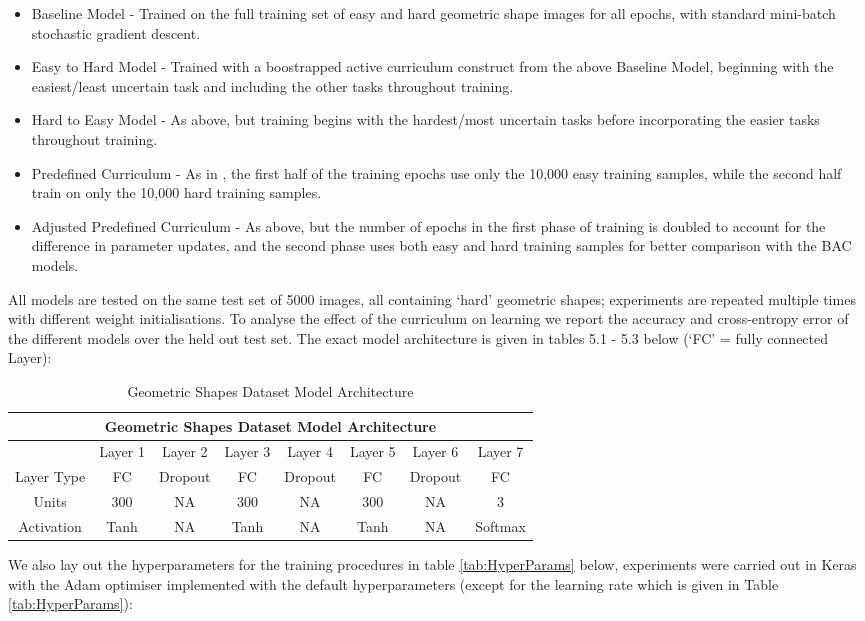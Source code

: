  \begin{itemize}
 \item Baseline Model - Trained on the full training set of easy and hard geometric shape images for all epochs, with standard mini-batch stochastic gradient descent.
 \item Easy to Hard Model - Trained with a boostrapped active curriculum construct from the above Baseline Model, beginning with the easiest/least uncertain task and including the other tasks throughout training.
 \item Hard to Easy Model - As above, but training begins with the hardest/most uncertain tasks before incorporating the easier tasks throughout training.
 \item Predefined Curriculum - As in \cite{Bengio2009}, the first half of the training epochs use only the 10,000 easy training samples, while the second half train on only the 10,000 hard training samples.
 \item Adjusted Predefined Curriculum - As above, but the number of epochs in the first phase of training is doubled to account for the difference in parameter updates, and the second phase uses both easy and hard training samples for better comparison with the BAC models.
 \end{itemize}
 
All models are tested on the same test set of 5000 images, all containing `hard' geometric shapes; experiments are repeated multiple times with different weight initialisations. To analyse the effect of the curriculum on learning we report the accuracy and cross-entropy error of the different models over the held out test set. The exact model architecture is given in tables 5.1 - 5.3 below (`FC' = fully connected Layer):
 
\begin{table}[h]
\caption{Geometric Shapes Dataset Model Architecture} \label{tab:GeoArchitecture}
\begin{tabular}{|c||c|c|c|c|c|c|c|}
\hline
\multicolumn{8}{|c|}{Geometric Shapes Dataset Model Architecture} \\
\hline
 & Layer 1 & Layer 2 & Layer 3& Layer 4 &Layer 5 & Layer 6 & Layer 7 \\
\hline
Layer Type & FC & Dropout & FC & Dropout & FC & Dropout  & FC \\
\hline
Units & 300 & NA & 300 & NA & 300 & NA & 3 \\
\hline
Activation & Tanh \footnotemark & NA & Tanh & NA & Tanh & NA & Softmax \\
\hline
\end{tabular}
\end{table}
We also lay out the hyperparameters for the training procedures in table \ref{tab:HyperParams} below, experiments were carried out in Keras \cite{chollet2015keras} with the Adam optimiser implemented with the default hyperparameters (except for the learning rate which is given in Table \ref{tab:HyperParams}):

